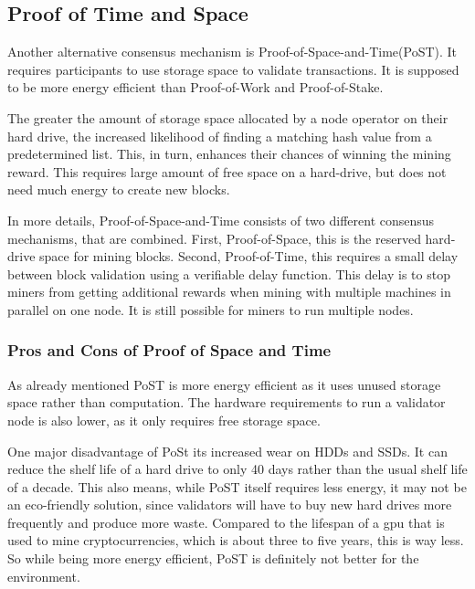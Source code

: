 \subsection{Proof of Time and Space}\label{subsec:proof-of-time-and-space}
Another alternative consensus mechanism is Proof-of-Space-and-Time(PoST).
It requires participants to use storage space to validate transactions.
It is supposed to be more energy efficient than Proof-of-Work and Proof-of-Stake.

The greater the amount of storage space allocated by a node operator on their hard drive, the increased likelihood of finding a matching hash value from a predetermined list.
This, in turn, enhances their chances of winning the mining reward.
This requires large amount of free space on a hard-drive, but does not need much energy to create new blocks.

In more details, Proof-of-Space-and-Time consists of two different consensus mechanisms, that are combined.
First, Proof-of-Space, this is the reserved hard-drive space for mining blocks.
Second, Proof-of-Time, this requires a small delay between block validation using a verifiable delay function.
This delay is to stop miners from getting additional rewards when mining with multiple machines in parallel on one node.
It is still possible for miners to run multiple nodes.\cite{supraoracles-post}

\subsubsection{Pros and Cons of Proof of Space and Time}
As already mentioned PoST is more energy efficient as it uses unused storage space rather than computation.
The hardware requirements to run a validator node is also lower, as it only requires free storage space.

One major disadvantage of PoSt its increased wear on HDDs and SSDs.
It can reduce the shelf life of a hard drive to only 40 days rather than the usual shelf life of a decade.
This also means, while PoST itself requires less energy, it may not be an eco-friendly solution, since validators will have to buy new hard drives more frequently and produce more waste.
Compared to the lifespan of a gpu that is used to mine cryptocurrencies, which is about three to five years, this is way less.
So while being more energy efficient, PoST is definitely not better for the environment.\cite{euronews-chia, devicetest-gpu-lifespan, supraoracles-post}

